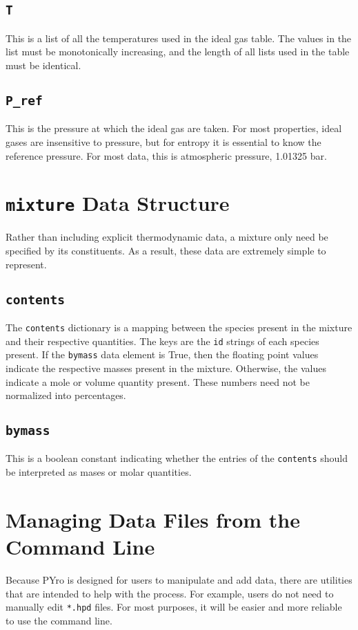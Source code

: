 \subsection{\texttt{T}}
This is a list of all the temperatures used in the ideal gas table.  The values in the list must be monotonically increasing, and the length of all lists used in the table must be identical.

\subsection{\texttt{P\_ref}}
This is the pressure at which the ideal gas are taken.  For most properties, ideal gases are insensitive to pressure, but for entropy it is essential to know the reference pressure.  For most data, this is atmospheric pressure, 1.01325 bar.



\section{\texttt{mixture} Data Structure}
Rather than including explicit thermodynamic data, a mixture only need be specified by its constituents.  As a result, these data are extremely simple to represent.

\subsection{\texttt{contents}}
The \verb|contents| dictionary is a mapping between the species present in the mixture and their respective quantities.  The keys are the \verb|id| strings of each species present.  If the \verb|bymass| data element is True, then the floating point values indicate the respective masses present in the mixture.  Otherwise, the values indicate a mole or volume quantity present.  These numbers need not be normalized into percentages.

\subsection{\texttt{bymass}}
This is a boolean constant indicating whether the entries of the \verb|contents| should be interpreted as mases or molar quantities.





\section{Managing Data Files from the Command Line}
Because PYro is designed for users to manipulate and add data, there are utilities that are intended to help with the process.  For example, users do not need to manually edit \verb|*.hpd| files.  For most purposes, it will be easier and more reliable to use the command line.

